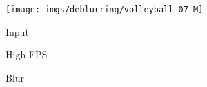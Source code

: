 \documentclass[10pt,twocolumn,letterpaper]{article}
\begin{document}
\begin{figure}
\begin{minipage}[t]{.12\linewidth}
		\centering
		\texttt{[image: imgs/deblurring/volleyball\_07\_M]}
	\end{minipage}
\begin{minipage}[t]{.24\linewidth}
		\centering
		Input 
	\end{minipage}\hfill \begin{minipage}[t]{.24\linewidth}
		\centering
		High FPS\end{minipage}\hfill \begin{minipage}[t]{.24\linewidth}
		\centering
		Blur 
	\end{minipage}\hfill \begin{minipage}[t]{.12\linewidth}
		\centering
		
	\end{minipage}\hfill \begin{minipage}[t]{.12\linewidth}
		\centering
		

\end{minipage}
\end{figure}
\end{document}
